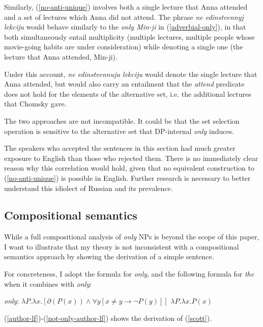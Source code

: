 Similarly, (\ref{no-anti-unique}) involves both a single lecture that Anna attended and a set of lectures which Anna did not attend. The phrase \textit{ne edinstvennyj lekciju} would behave similarly to the \textit{only Min-ji} in (\ref{adverbial-only}), in that both simultaneously entail multiplicity (multiple lectures, multiple people whose movie-going habits are under consideration) while denoting a single one (the lecture that Anna attended, Min-ji).

Under this account, \textit{ne edinstvennuju lekciju} would denote the single lecture that Anna attended, but would also carry an entailment that the \textit{attend} predicate does not hold for the elements of the alternative set, i.e. the additional lectures that Chomsky gave.

The two approaches are not incompatible. It could be that the set selection operation is sensitive to the alternative set that DP-internal \textit{only} induces.

The speakers who accepted the sentences in this section had much greater exposure to English than those who rejected them. There is no immediately clear reason why this correlation would hold, given that no equivalent construction to (\ref{no-anti-unique}) is possible in English. Further research is necessary to better understand this idiolect of Russian and its prevalence.

\subsection{Compositional semantics}
While a full compositional analysis of \textit{only} NPs is beyond the scope of this paper, I want to illustrate that my theory is not inconsistent with a compositional semantics approach by showing the derivation of a simple sentence.

For concreteness, I adopt the  formula for \textit{only}, and the following formula for \textit{the} when it combines with \textit{only}:

\begin{exe}
	  \textit{only}: $ \lambda P . \lambda x . [ \partial(P(x)) \land \forall y [ x \ne y \to \neg P(y) ] ] $
	\ex $\lambda P . \lambda x . P(x)$
\end{exe}

(\ref{author-lf})-(\ref{not-only-author-lf}) shows the derivation of (\ref{scott}).

